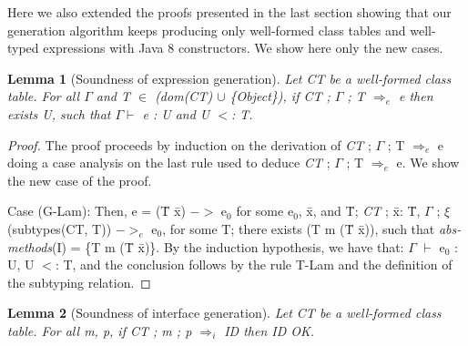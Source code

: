 \documentclass[tese,capa,english]{texufpel}
\newtheorem{lemma}{Lemma}
\begin{document}
\vspace{10pt}

Here we also extended the proofs presented in the last section showing that our generation algorithm keeps producing only well-formed class tables and well-typed expressions with Java 8 constructors. We show here only the new cases.

\begin{lemma}[Soundness of expression generation]
\label{lem:fje-seg}
Let \emph{CT} be a well-formed class table. For all $\Gamma$ and T $\in$ \emph{(}dom\emph{(CT)} $\cup$ \emph{\{Object\}}\emph{)}, if \emph{CT} ; $\Gamma$ ; T $\Rightarrow_{e}$ e then exists U, such that $\Gamma \vdash$  e : U and U $<$: T.
\end{lemma}

\begin{proof}
The proof proceeds by induction on the derivation of \emph{CT} ; $\Gamma$ ; T $\Rightarrow_{e}$ e doing a case analysis on the last rule used to deduce \emph{CT} ; $\Gamma$ ; T $\Rightarrow_{e}$ e. We show the new case of the proof.

\vspace{8pt}

Case (G-Lam): Then, e = (\={T} \={x}) $->$ e$_0$ for some e$_0$, \={x}, and \={T}; \emph{CT} ; \={x}: \={T}, $\Gamma$ ; $\xi$(subtypes(CT, T)) $->_{e}$ e$_0$, for some T; there exists (T m (\={T} \={x})), such that \emph{abs-methods}(I) = \{T m (\={T} \={x})\}. By the induction hypothesis, we have that: $\Gamma$ $\vdash$ e$_0$ : U, U $<$: T, and the conclusion follows by the rule {\footnotesize T-Lam} and the definition of the subtyping relation.
\end{proof}

\begin{lemma}[Soundness of interface generation]
\label{lem:fje-sig}
Let \emph{CT} be a well-formed class table. For all m, p, if \emph{CT} ; m ; p $\Rightarrow_{i}$ ID then ID OK.
\end{lemma}
\end{document}
